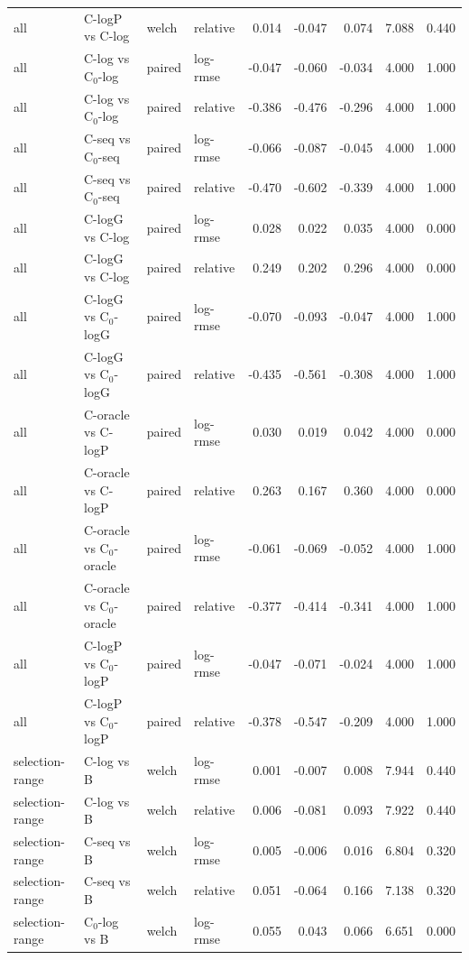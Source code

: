 \begin{longtable}{llllrrrrr}
all & C-logP vs C-log & welch & relative & 0.014 & -0.047 & 0.074 & 7.088 & 0.440 \\
all & C-log vs C$_0$-log & paired & log-rmse & -0.047 & -0.060 & -0.034 & 4.000 & 1.000 \\
all & C-log vs C$_0$-log & paired & relative & -0.386 & -0.476 & -0.296 & 4.000 & 1.000 \\
all & C-seq vs C$_0$-seq & paired & log-rmse & -0.066 & -0.087 & -0.045 & 4.000 & 1.000 \\
all & C-seq vs C$_0$-seq & paired & relative & -0.470 & -0.602 & -0.339 & 4.000 & 1.000 \\
all & C-logG vs C-log & paired & log-rmse & 0.028 & 0.022 & 0.035 & 4.000 & 0.000 \\
all & C-logG vs C-log & paired & relative & 0.249 & 0.202 & 0.296 & 4.000 & 0.000 \\
all & C-logG vs C$_0$-logG & paired & log-rmse & -0.070 & -0.093 & -0.047 & 4.000 & 1.000 \\
all & C-logG vs C$_0$-logG & paired & relative & -0.435 & -0.561 & -0.308 & 4.000 & 1.000 \\
all & C-oracle vs C-logP & paired & log-rmse & 0.030 & 0.019 & 0.042 & 4.000 & 0.000 \\
all & C-oracle vs C-logP & paired & relative & 0.263 & 0.167 & 0.360 & 4.000 & 0.000 \\
all & C-oracle vs C$_0$-oracle & paired & log-rmse & -0.061 & -0.069 & -0.052 & 4.000 & 1.000 \\
all & C-oracle vs C$_0$-oracle & paired & relative & -0.377 & -0.414 & -0.341 & 4.000 & 1.000 \\
all & C-logP vs C$_0$-logP & paired & log-rmse & -0.047 & -0.071 & -0.024 & 4.000 & 1.000 \\
all & C-logP vs C$_0$-logP & paired & relative & -0.378 & -0.547 & -0.209 & 4.000 & 1.000 \\
selection-range & C-log vs B & welch & log-rmse & 0.001 & -0.007 & 0.008 & 7.944 & 0.440 \\
selection-range & C-log vs B & welch & relative & 0.006 & -0.081 & 0.093 & 7.922 & 0.440 \\
selection-range & C-seq vs B & welch & log-rmse & 0.005 & -0.006 & 0.016 & 6.804 & 0.320 \\
selection-range & C-seq vs B & welch & relative & 0.051 & -0.064 & 0.166 & 7.138 & 0.320 \\
selection-range & C$_0$-log vs B & welch & log-rmse & 0.055 & 0.043 & 0.066 & 6.651 & 0.000 \\

\end{longtable}
